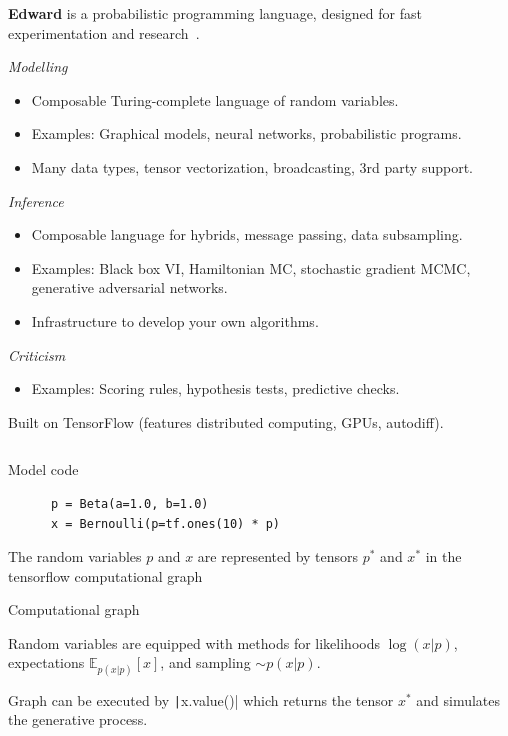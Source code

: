 \documentclass[10pt]{beamer}
\begin{document}
\begin{frame}
\vspace{3ex}
\textbf{Edward} is a probabilistic programming language,
designed for fast experimentation and research~\citep{tran_deep_2017}.

\emph{Modelling}
\begin{itemize}
\item Composable Turing-complete language of random variables.
\item Examples: Graphical models, neural networks, probabilistic programs.
\item Many data types, tensor vectorization, broadcasting, 3rd party support.
\end{itemize}

\emph{Inference}
\begin{itemize}
\item Composable language for hybrids, message passing, data subsampling.
\item Examples: Black box VI, Hamiltonian MC, stochastic gradient MCMC,
  generative adversarial networks.
\item Infrastructure to develop your own algorithms.
\end{itemize}

\emph{Criticism}
\begin{itemize}
\item Examples: Scoring rules, hypothesis tests, predictive checks.
\end{itemize}

\vspace{1ex}
Built on TensorFlow (features distributed computing, GPUs, autodiff).
\end{frame}

\begin{frame}[fragile]
\inputminted{python}{python/beta-bernoulli.py}
\end{frame}

\begin{frame}[fragile]
  \begin{block}{Model code}
    \begin{verbatim}
      p = Beta(a=1.0, b=1.0)
      x = Bernoulli(p=tf.ones(10) * p)
    \end{verbatim}
  \end{block}
  The random variables $p$ and $x$ are represented by tensors $p^*$ and $x^*$ in the tensorflow computational graph
  \begin{block}{Computational graph}
    \begin{center}
      
    \end{center}
  \end{block}
  Random variables are equipped with methods for likelihoods $\log(x|p)$,
  expectations $\mathbb{E}_{p(x|p)}[x]$, and sampling $\sim p(x|p)$.

  Graph can be executed by \texttt|x.value()| which returns the tensor $x^*$ and simulates the
  generative process.
\end{frame}
\end{document}

